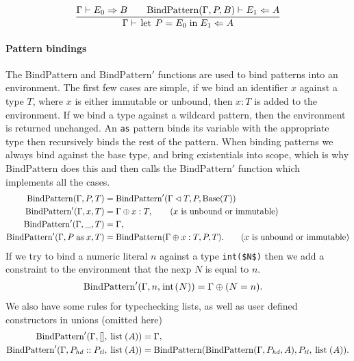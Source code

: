 \[
\frac{\tinfer{\Gamma}{E_0}{B}
      \qquad
      \tcheck{\mathrm{BindPattern}(\Gamma, P, B)}{E_1}{A}}
     {\tcheck{\Gamma}{\msail{let $\;P\;$ = $\;E_0\;$ in $\;E_1$}}{A}}
\]

\paragraph{Pattern bindings} The $\mathrm{BindPattern}$ and $\mathrm{BindPattern}'$ functions are used to bind patterns into an environment. The first few cases are simple, if we bind an identifier $x$ against a type $T$, where $x$ is either immutable or unbound, then $x : T$ is added to the environment. If we bind a type against a wildcard pattern, then the environment is returned unchanged. An \lstinline+as+ pattern binds its variable with the appropriate type then recursively binds the rest of the pattern. When binding patterns we always bind against the base type, and bring existentials into scope, which is why $\mathrm{BindPattern}$ does this and then calls the $\mathrm{BindPattern}'$ function which implements all the cases.
\begin{align*}
  \mathrm{BindPattern}(\Gamma, P, T) &= \mathrm{BindPattern}'(\Gamma \lhd T, P, \mathrm{Base}(T))\\
  \mathrm{BindPattern}'(\Gamma, x, T) &= \Gamma \oplus x : T, \tag{$x$ is unbound or immutable}\\
  \mathrm{BindPattern}'(\Gamma, \msail{_}, T) &= \Gamma,\\
  \mathrm{BindPattern}'(\Gamma, \msail{$P\;$ as $\;x$}, T) &= \mathrm{BindPattern}(\Gamma \oplus x : T, P, T). \tag{$x$ is unbound or immutable}
\end{align*}
If we try to bind a numeric literal $n$ against a type
\lstinline[mathescape]+int($N$)+ then we add a constraint to the
environment that the nexp $N$ is equal to $n$.
\begin{align*}
\mathrm{BindPattern}'(\Gamma, n, \msail{int($N$)}) &= \Gamma \oplus (N = n).
\end{align*}
We also have some rules for typechecking lists, as well as user
defined constructors in unions (omitted here)
\begin{align*}
  \mathrm{BindPattern}'(\Gamma, [], \msail{list($A$)}) &= \Gamma,\\
  \mathrm{BindPattern}'(\Gamma, \msail{$P_{\mathit{hd}}\;$ :: $\;P_{\mathit{tl}}$}, \msail{list($A$)})
  &= \mathrm{BindPattern}(\mathrm{BindPattern}(\Gamma,P_{\mathit{hd}},A),P_{\mathit{tl}},\msail{list($A$)}).
\end{align*}


